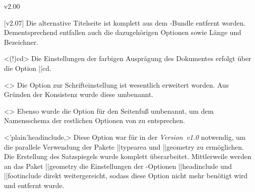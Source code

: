 \begin{Changes}{v2.00}
\begin{Obsolete}
  {}
\begin{Obsolete}
  {}
\begin{Obsolete}
  {}
\begin{Obsolete}
  {}
\printdeclarationlist
%
[v2.07]%
Die alternative Titelseite ist komplett aus dem \TUDScript-Bundle entfernt 
worden. Dementsprechend entfallen auch die dazugehörigen Optionen sowie Länge 
und Bezeichner.
\end{Obsolete}
\end{Obsolete}
\end{Obsolete}
\end{Obsolete}

\begin{Obsolete}
  {}
  <\Option(!){cd}>
\printdeclarationlist
%
Die Einstellungen der farbigen Ausprägung des Dokumentes erfolgt über die 
Option \Option||{cd}.
\end{Obsolete}

\begin{Obsolete}
  {}
  <>
\printdeclarationlist
%
Die Option zur Schrifteinstellung ist wesentlich erweitert worden. Aus Gründen 
der Konsistenz wurde diese umbenannt.
\end{Obsolete}

\begin{Obsolete}
  {}
  <>
\printdeclarationlist
%
Ebenso wurde die Option für den Seitenfuß umbenannt, um dem Namensschema der 
restlichen Optionen von \TUDScript zu entsprechen.
\end{Obsolete}

\begin{Obsolete}
  {}
  <\Option'plain'{headinclude},>
\printdeclarationlist
%
Diese Option war für \TUDScript in der \emph{Version~v1.0} notwendig, um die 
parallele Verwendung der Pakete \Package||{typearea} und \Package||{geometry} 
zu ermöglichen. Die Erstellung des Satzspiegels wurde komplett überarbeitet. 
Mittlerweile werden an das Paket \Package||{geometry} die Einstellungen der 
\KOMAScript-Optionen \Option||{headinclude} und \Option||{footinclude} direkt 
weitergereicht, sodass diese Option nicht mehr benötigt wird und entfernt wurde.
\end{Obsolete}


\end{Changes}
